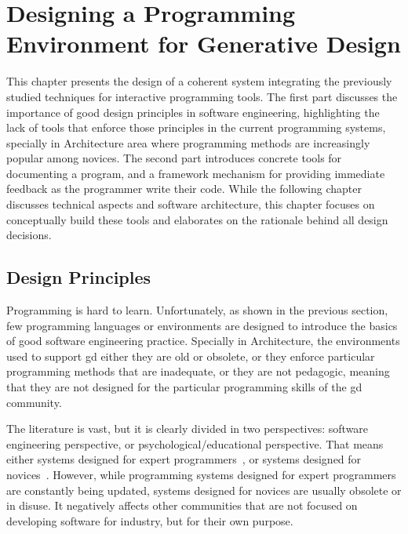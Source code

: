 \chapter{Designing a Programming Environment for Generative Design}
\label{chapter:pegd}

This chapter presents the design of a coherent system integrating the previously studied techniques for interactive programming tools. The first part discusses the importance of good design principles in software engineering, highlighting the lack of tools that enforce those principles in the current programming systems, specially in Architecture area where programming methods are increasingly popular among novices. The second part introduces concrete tools for documenting a program, and a framework mechanism for providing immediate feedback as the programmer write their code. While the following chapter discusses technical aspects and software architecture, this chapter focuses on conceptually build these tools and elaborates on the rationale behind all design decisions.

\section{Design Principles} 

Programming is hard to learn. Unfortunately, as shown in the previous section, few programming languages or environments are designed to introduce the basics of good software engineering practice. Specially in Architecture, the environments used to support \gls{gd} either they are old or obsolete, or they enforce particular programming methods that are inadequate, or they are not pedagogic, meaning that they are not designed for the particular programming skills of the \gls{gd} community.

The literature is vast, but it is clearly divided in two perspectives: software engineering perspective, or psychological/educational perspective. That means either systems designed for expert programmers~\citep{carlson2005eclipse,intellij2001intellij,lighttable,boudreau2002netbeans,guckenheimer2006software}, or systems designed for novices~\citep{papert1980mindstorms,goldberg1983smalltalk,GuoSIGCSE2013,Reas2006}. However, while programming systems designed for expert programmers are constantly being updated, systems designed for novices are usually obsolete or in disuse. It negatively affects other communities that are not focused on developing software for industry, but for their own purpose.

